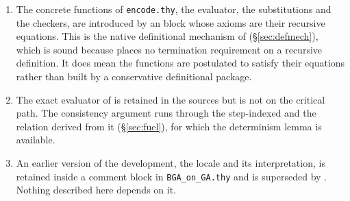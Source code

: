 \documentclass[11pt]{article}
\begin{document}
\begin{enumerate}
\item The concrete functions of \texttt{encode.thy}, the evaluator, the
      substitutions and the checkers, are introduced by an
       block whose axioms are their recursive \isa{:=}
      equations.  This is the native definitional mechanism of \GA{}
      (\S\ref{sec:defmech}), which is sound because \GA{} places no termination
      requirement on a recursive definition.  It does mean the functions are
      postulated to satisfy their equations rather than built by a conservative
      definitional package.
\item The exact evaluator  of  is retained in the
      sources but is not on the critical path.  The consistency argument runs
      through the step-indexed  and the relation 
      derived from it (\S\ref{sec:fuel}), for which the determinism lemma is
      available.
\item An earlier version of the development, the locale  and its
      interpretation, is retained inside a comment block in
      \texttt{BGA\_on\_GA.thy} and is superseded by .  Nothing
      described here depends on it.
\end{enumerate}
\end{document}
